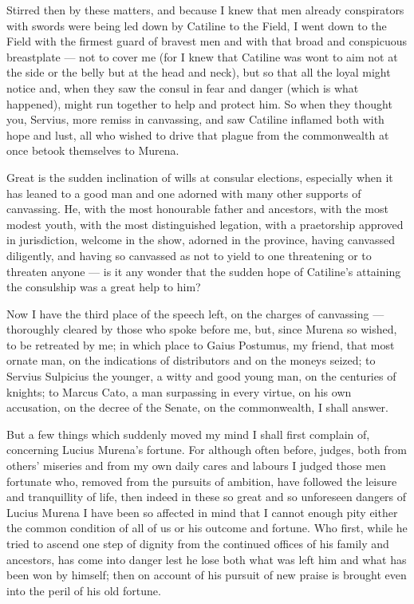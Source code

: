  Stirred then by these matters, and because I knew that men already conspirators with swords were being led down by Catiline to the Field, I went down to the Field with the firmest guard of bravest men and with that broad and conspicuous breastplate --- not to cover me (for I knew that Catiline was wont to aim not at the side or the belly but at the head and neck), but so that all the loyal might notice and, when they saw the consul in fear and danger (which is what happened), might run together to help and protect him. So when they thought you, Servius, more remiss in canvassing, and saw Catiline inflamed both with hope and lust, all who wished to drive that plague from the commonwealth at once betook themselves to Murena.

 Great is the sudden inclination of wills at consular elections, especially when it has leaned to a good man and one adorned with many other supports of canvassing. He, with the most honourable father and ancestors, with the most modest youth, with the most distinguished legation, with a praetorship approved in jurisdiction, welcome in the show, adorned in the province, having canvassed diligently, and having so canvassed as not to yield to one threatening or to threaten anyone --- is it any wonder that the sudden hope of Catiline's attaining the consulship was a great help to him?

 Now I have the third place of the speech left, on the charges of canvassing --- thoroughly cleared by those who spoke before me, but, since Murena so wished, to be retreated by me; in which place to Gaius Postumus, my friend, that most ornate man, on the indications of distributors and on the moneys seized; to Servius Sulpicius the younger, a witty and good young man, on the centuries of knights; to Marcus Cato, a man surpassing in every virtue, on his own accusation, on the decree of the Senate, on the commonwealth, I shall answer.

 But a few things which suddenly moved my mind I shall first complain of, concerning Lucius Murena's fortune. For although often before, judges, both from others' miseries and from my own daily cares and labours I judged those men fortunate who, removed from the pursuits of ambition, have followed the leisure and tranquillity of life, then indeed in these so great and so unforeseen dangers of Lucius Murena I have been so affected in mind that I cannot enough pity either the common condition of all of us or his outcome and fortune. Who first, while he tried to ascend one step of dignity from the continued offices of his family and ancestors, has come into danger lest he lose both what was left him and what has been won by himself; then on account of his pursuit of new praise is brought even into the peril of his old fortune.

